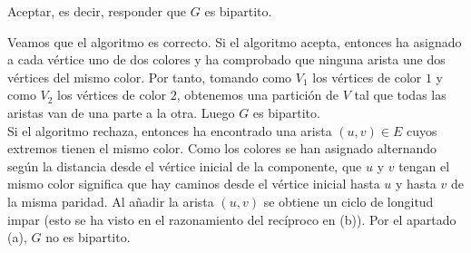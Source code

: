 \begin{ejercicio}
\begin{enumerate}
\begin{algorithm}
\begin{algorithmic}
                    \State Aceptar, es decir, responder que $G$ es bipartito.
                \end{algorithmic}
            \end{algorithm}

            Veamos que el algoritmo es correcto. Si el algoritmo acepta, entonces ha asignado a cada vértice uno de dos colores y ha comprobado que ninguna arista une dos vértices del mismo color. Por tanto, tomando como $V_1$ los vértices de color $1$ y como $V_2$ los vértices de color $2$, 
            obtenemos una partición de $V$ tal que todas las aristas van de una parte a la otra. Luego $G$ es bipartito. \\

            Si el algoritmo rechaza, entonces ha encontrado una arista $(u,v) \in E$ cuyos extremos tienen el mismo color. Como los colores se han asignado alternando según la distancia desde el vértice inicial de la componente, que 
            $u$ y $v$ tengan el mismo color significa que hay caminos desde el vértice inicial hasta $u$ y hasta $v$ de la misma paridad. 
            Al añadir la arista $(u,v)$ se obtiene un ciclo de longitud impar (esto se ha visto en el razonamiento del recíproco en (b)). 
            Por el apartado (a), $G$ no es bipartito.
    \end{enumerate}
\end{ejercicio}

